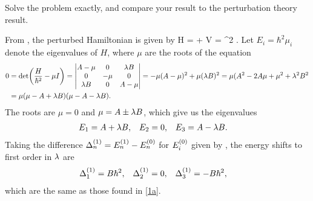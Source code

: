 \newcommand{\mui}{\mu_i}

\newcommand{\Ei}{E_i}
\newcommand{\Eq}{E_1}
\newcommand{\Ew}{E_2}
\newcommand{\Ee}{E_3}

\newcommand{\Eoi}{E\suo_i}

\clearpage
\begin{problem}
	Solve the problem exactly, and compare your result to the perturbation theory result.
\end{problem}

\begin{solution}
	From , the perturbed Hamiltonian is given by
	\beq
		H = \Ho + \lam V = \hbar^2 .
	\eeq
	Let $\Ei = \hbar^2 \mui$ denote the eigenvalues of $H$, where $\mu$ are the roots of the equation
	\begin{align*}
		0 &= \det(\frac{H}{\hbar^2} - \mu I)
		= \mqty| A - \mu & 0 & \lam B \\ 0 & -\mu & 0 \\ \lam B & 0 & A - \mu |
		= - \mu (A - \mu)^2 + \mu (\lam B)^2
		= \mu (A^2 - 2A \mu + \mu^2 + \lam^2 B^2 \\
		&= \mu (\mu - A + \lam B) (\mu - A - \lam B).
	\end{align*}
	The roots are $\mu = 0$ and $\mu = A \pm \lambda B$, which give us the eigenvalues
	\begin{align*}
		\Eq &= A + \lam B, &
		\Ew &= 0, &
		\Ee &= A - \lam B.
	\end{align*}
	Taking the difference $\Delta^{(1)}_n = E^{(1)}_n - E^{(0)}_n$ for $\Eoi$ given by , the energy shifts to first order in $\lambda$ are
	\begin{align*}
		\Delta^{(1)}_1 &= B \hbar^2, &
		\Delta^{(1)}_2 &= 0, &
		\Delta^{(1)}_3 &= -B \hbar^2,
	\end{align*}
	which are the same as those found in \ref{1a}.
\end{solution}